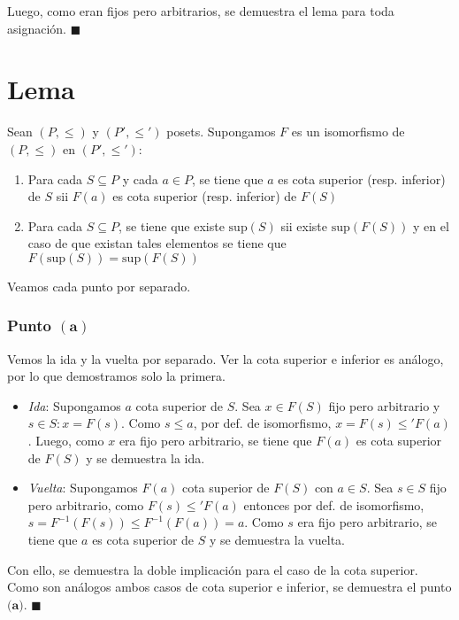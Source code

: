 \documentclass{article}
\begin{document}
Luego, como eran fijos pero arbitrarios, se demuestra el lema para toda asignación. $\blacksquare$

\section*{Lema}
Sean $(P,\leq)$ y $(P',\leq')$ posets. Supongamos $F$ es un isomorfismo de $(P,\leq)$ en $(P',\leq')$:
\begin{enumerate}[label=(\alph*)]
  \item Para cada $S\subseteq P$ y cada $a\in P$, se tiene que $a$ es cota superior (resp. inferior) de $S$ sii $F(a)$ es cota superior (resp. inferior) de $F(S)$
  \item Para cada $S\subseteq P$, se tiene que existe $\text{sup}(S)$ sii existe $\text{sup}(F(S))$ y en el caso de que existan tales elementos se tiene que $F(\text{sup}(S))=\text{sup}(F(S))$
\end{enumerate}
Veamos cada punto por separado.

\subsubsection*{Punto $\mathbf{(a)}$}
Vemos la ida y la vuelta por separado. Ver la cota superior e inferior es análogo, por lo que demostramos solo la primera.
\begin{itemize}
  \item \textit{Ida}: Supongamos $a$ cota superior de $S$. Sea $x\in F(S)$ fijo pero arbitrario y $s\in S:x=F(s)$. Como $s\leq a$, por def. de isomorfismo, $x=F(s)\leq' F(a)$. Luego, como $x$ era fijo pero arbitrario, se tiene que $F(a)$ es cota superior de $F(S)$ y se demuestra la ida.
  \item \textit{Vuelta}: Supongamos $F(a)$ cota superior de $F(S)$ con $a\in S$. Sea $s\in S$ fijo pero arbitrario, como $F(s)\leq'F(a)$ entonces por def. de isomorfismo, $s=F^{-1}(F(s))\leq F^{-1}(F(a))=a$. Como $s$ era fijo pero arbitrario, se tiene que $a$ es cota superior de $S$ y se demuestra la vuelta.
\end{itemize}

Con ello, se demuestra la doble implicación para el caso de la cota superior. Como son análogos ambos casos de cota superior e inferior, se demuestra el punto $\textbf{(a)}$. $\blacksquare$
\end{document}
